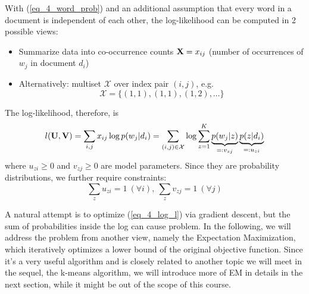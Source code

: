\documentclass[../book-template.tex]{subfiles}
\begin{document}
\par With (\ref{eq_4_word_prob}) and an additional assumption that every word in a document is independent of each other, the log-likelihood can be computed in 2 possible views:
\begin{itemize}
	\item Summarize data into co-occurrence counts ${\bf X}=x_{ij}$ (number of occurrences of $w_j$ in document $d_i$)
	\item Alternatively: multiset $\mathcal{X}$ over index pair $(i,j)$, e.g. 
	$$\mathcal{X} = \{(1,1), (1,1), (1, 2),\dots\}$$
\end{itemize} 
The log-likelihood, therefore, is
\begin{equation}\label{eq_4_log_l}
	l({\bf U},{\bf V})=\sum_{i,j}x_{ij}\log p(w_j|d_i)=\sum_{(i,j)\in \mathcal{X}}\log \sum_{z=1}^{K} \underbrace{p(w_j|z)}_{=:v_{zj}}\underbrace{p(z|d_i)}_{=:u_{zi}}
\end{equation}
where $u_{zi}\geq 0$ and $v_{zj}\geq 0$ are model parameters. Since they are probability distributions, we further require constraints:
\begin{equation*}
	\sum_z u_{zi}=1\ (\forall i),\ \sum_z v_{zj}=1\ (\forall j)
\end{equation*}
\par A natural attempt is to optimize (\ref{eq_4_log_l}) via gradient descent, but the sum of probabilities inside the log can cause problem. In the following, we will address the problem from another view, namely the Expectation Maximization, which iteratively optimizes a lower bound of the original objective function. Since it's a very useful algorithm and is closely related to another topic we will meet in the sequel, the k-means algorithm, we will introduce more of EM in details in the next section, while it might be out of the scope of this course.
\end{document}
